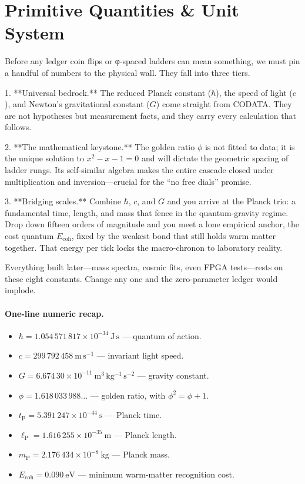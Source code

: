 \documentclass[11pt,oneside]{book}
\begin{document}
\section{Primitive Quantities \& Unit System}
\label{sec:primitive-quantities}

Before any ledger coin flips or φ-spaced ladders can mean something, we must
pin a handful of numbers to the physical wall.  They fall into three tiers.

1. **Universal bedrock.**  
   The reduced Planck constant ($\hbar$), the speed of light ($c$), and
   Newton’s gravitational constant ($G$) come straight from CODATA.  They are
   not hypotheses but measurement facts, and they carry every calculation that
   follows.

2. **The mathematical keystone.**  
   The golden ratio $\phi$ is not fitted to data; it is the unique solution to
   $x^{2}-x-1=0$ and will dictate the geometric spacing of ladder rungs.  Its
   self-similar algebra makes the entire cascade closed under multiplication
   and inversion—crucial for the “no free dials” promise.

3. **Bridging scales.**  
   Combine $\hbar$, $c$, and $G$ and you arrive at the Planck trio:
   a fundamental time, length, and mass that fence in the quantum-gravity
   regime.  Drop down fifteen orders of magnitude and you meet a lone
   empirical anchor, the cost quantum $E_{\text{coh}}$, fixed by the weakest
   bond that still holds warm matter together.  That energy per tick locks the
   macro-chronon to laboratory reality.

Everything built later—mass spectra, cosmic fits, even FPGA tests—rests on
these eight constants.  Change any one and the zero-parameter ledger would
implode.

\paragraph*{One-line numeric recap.}
\begin{itemize}
  \item $\hbar = 1.054\,571\,817\times10^{-34}\ \mathrm{J\,s}$ — quantum of action.
  \item $c = 299\,792\,458\ \mathrm{m\,s^{-1}}$ — invariant light speed.
  \item $G = 6.674\,30\times10^{-11}\ \mathrm{m^{3}\,kg^{-1}\,s^{-2}}$ — gravity constant.
  \item $\phi = 1.618\,033\,988\dots$ — golden ratio, with $\phi^{2}=\phi+1$.
  \item $t_{\text{P}} = 5.391\,247\times10^{-44}\ \mathrm{s}$ — Planck time.
  \item $\ell_{\text{P}} = 1.616\,255\times10^{-35}\ \mathrm{m}$ — Planck length.
  \item $m_{\text{P}} = 2.176\,434\times10^{-8}\ \mathrm{kg}$ — Planck mass.
  \item $E_{\text{coh}} = 0.090\ \mathrm{eV}$ — minimum warm-matter recognition cost.
\end{itemize}
\end{document}
